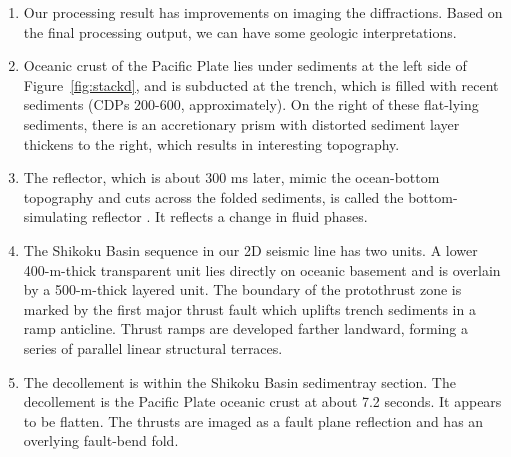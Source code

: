 \begin{enumerate}

\item Our processing result has improvements on imaging the diffractions. Based on the final processing output, we can have some geologic interpretations. 

\item Oceanic crust of the Pacific Plate lies under sediments at the left side of Figure~\ref{fig:stackd}, and is subducted at the trench, which is filled with recent sediments (CDPs 200-600, approximately). On the right of these flat-lying sediments, there is an accretionary prism with distorted sediment layer thickens to the right, which results in interesting topography. 

\item The reflector, which is about 300 ms later, mimic the ocean-bottom topography and cuts across the folded sediments, is called the bottom-simulating reflector \cite[]{SU}. It reflects a change in fluid phases.  

\item The Shikoku Basin sequence in our 2D seismic line has two units. A lower 400-m-thick transparent unit lies directly on oceanic basement and is overlain by a 500-m-thick layered unit. The boundary of the protothrust zone is marked by the first major thrust fault which uplifts trench sediments in a ramp anticline. Thrust ramps are developed farther landward, forming a series of parallel linear structural terraces.

\item The decollement is within the Shikoku Basin sedimentray section. The decollement is the Pacific Plate oceanic crust at about 7.2 seconds. It appears to be flatten. The thrusts are imaged as a fault plane reflection and has an overlying fault-bend fold.   

\end{enumerate}
\lstset{language=python,numbers=left,numberstyle=\tiny,showstringspaces=false}





